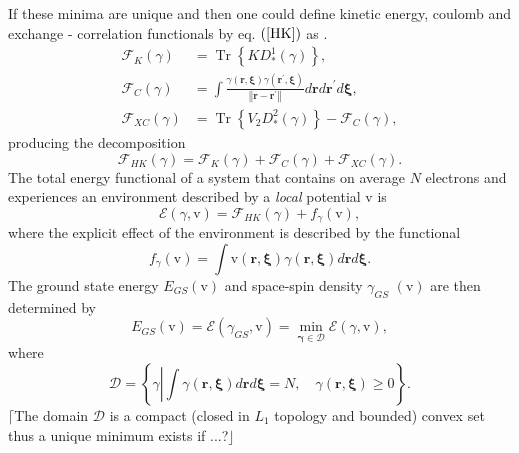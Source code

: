 \documentclass[aps,preprint]{revtex4}%
\begin{document}
If these minima are unique and then one could define kinetic energy, coulomb
and exchange - correlation functionals by eq. $\left(  \ref{HK}\right)  $ as
$.$
\begin{align}
\mathcal{F}_{K}\left(  \gamma\right)   &  =\operatorname{Tr}\left\{  KD_{\ast
}^{1}\left(  \gamma\right)  \right\}  ,\nonumber\\
\mathcal{F}_{C}\left(  \gamma\right)   &  =\int\frac{\gamma\left(
\mathbf{r,\xi}\right)  \gamma\left(  \mathbf{r}^{\prime}\mathbf{,\xi}\right)
}{\left\Vert \mathbf{r-r}^{\prime}\right\Vert }d\mathbf{r}d\mathbf{r}^{\prime
}d\mathbf{\xi},\nonumber\\
\mathcal{F}_{XC}\left(  \gamma\right)   &  =\operatorname{Tr}\left\{
V_{2}D_{\ast}^{2}\left(  \gamma\right)  \right\}  -\mathcal{F}_{C}\left(
\gamma\right)  ,
\end{align}
producing the decomposition
\begin{equation}
\mathcal{F}_{HK}\left(  \gamma\right)  =\mathcal{F}_{K}\left(  \gamma\right)
+\mathcal{F}_{C}\left(  \gamma\right)  +\mathcal{F}_{XC}\left(  \gamma\right)
.
\end{equation}
The total energy functional of a system that contains on average $N$ electrons
and experiences an environment described by a \emph{local} potential
$\mathrm{v}$ is
\begin{equation}
\mathcal{E}\left(  \gamma\mathbf{,}\mathrm{v}\right)  =\mathcal{F}_{HK}\left(
\gamma\right)  +f_{\gamma}\left(  \mathrm{v}\right)  ,
\end{equation}
where the explicit effect of the environment is described by the functional
\begin{equation}
f_{\gamma}\left(  \mathrm{v}\right)  =\int\mathrm{v}\left(  \mathbf{r,\xi
}\right)  \gamma\left(  \mathbf{r,\xi}\right)  d\mathbf{r}d\mathbf{\xi.}%
\end{equation}
The ground state energy $E_{GS}\left(  \mathrm{v}\right)  $ and space-spin
density $\gamma_{GS}$ $\left(  \mathrm{v}\right)  $ are then determined by
\begin{equation}
E_{GS}\left(  \mathrm{v}\right)  =\mathcal{E}\left(  \gamma_{GS}%
\mathbf{,}\mathrm{v}\right)  =\min_{\mathbf{\gamma\in}\mathcal{D}}%
\mathcal{E}\left(  \gamma\mathbf{,}\mathrm{v}\right)  ,
\end{equation}
where
\begin{equation}
\mathcal{D=}\left\{  \gamma\left\vert \int\gamma\left(  \mathbf{r,\xi}\right)
d\mathbf{r}d\mathbf{\xi}=N,\quad\gamma\left(  \mathbf{r,\xi}\right)
\geq0\right.  \right\}  .
\end{equation}
$\lceil$The domain $\mathcal{D}$ is a compact (closed in $L_{1}$ topology and
bounded) convex set thus a unique minimum exists if ...?$\rfloor$
\end{document}
